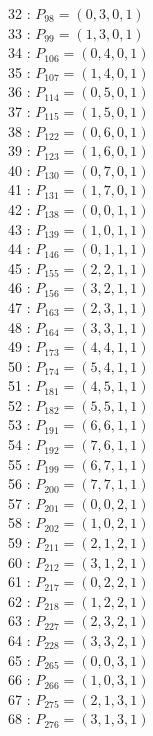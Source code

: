 \documentclass{article}
\begin{document}
{\begin{multicols}{3}
32 : $P_{98}=( 0, 3, 0, 1 )$\\
33 : $P_{99}=( 1, 3, 0, 1 )$\\
34 : $P_{106}=( 0, 4, 0, 1 )$\\
35 : $P_{107}=( 1, 4, 0, 1 )$\\
36 : $P_{114}=( 0, 5, 0, 1 )$\\
37 : $P_{115}=( 1, 5, 0, 1 )$\\
38 : $P_{122}=( 0, 6, 0, 1 )$\\
39 : $P_{123}=( 1, 6, 0, 1 )$\\
40 : $P_{130}=( 0, 7, 0, 1 )$\\
41 : $P_{131}=( 1, 7, 0, 1 )$\\
42 : $P_{138}=( 0, 0, 1, 1 )$\\
43 : $P_{139}=( 1, 0, 1, 1 )$\\
44 : $P_{146}=( 0, 1, 1, 1 )$\\
45 : $P_{155}=( 2, 2, 1, 1 )$\\
46 : $P_{156}=( 3, 2, 1, 1 )$\\
47 : $P_{163}=( 2, 3, 1, 1 )$\\
48 : $P_{164}=( 3, 3, 1, 1 )$\\
49 : $P_{173}=( 4, 4, 1, 1 )$\\
50 : $P_{174}=( 5, 4, 1, 1 )$\\
51 : $P_{181}=( 4, 5, 1, 1 )$\\
52 : $P_{182}=( 5, 5, 1, 1 )$\\
53 : $P_{191}=( 6, 6, 1, 1 )$\\
54 : $P_{192}=( 7, 6, 1, 1 )$\\
55 : $P_{199}=( 6, 7, 1, 1 )$\\
56 : $P_{200}=( 7, 7, 1, 1 )$\\
57 : $P_{201}=( 0, 0, 2, 1 )$\\
58 : $P_{202}=( 1, 0, 2, 1 )$\\
59 : $P_{211}=( 2, 1, 2, 1 )$\\
60 : $P_{212}=( 3, 1, 2, 1 )$\\
61 : $P_{217}=( 0, 2, 2, 1 )$\\
62 : $P_{218}=( 1, 2, 2, 1 )$\\
63 : $P_{227}=( 2, 3, 2, 1 )$\\
64 : $P_{228}=( 3, 3, 2, 1 )$\\
65 : $P_{265}=( 0, 0, 3, 1 )$\\
66 : $P_{266}=( 1, 0, 3, 1 )$\\
67 : $P_{275}=( 2, 1, 3, 1 )$\\
68 : $P_{276}=( 3, 1, 3, 1 )$\\

\end{multicols}}
\end{document}
